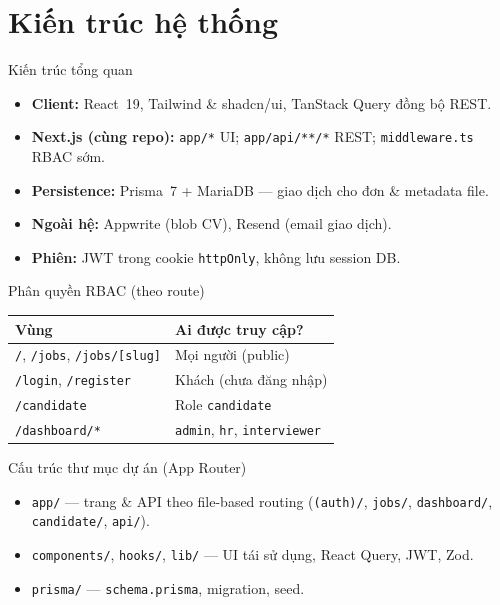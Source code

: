 \section{Kiến trúc hệ thống}
\begin{frame}{Kiến trúc tổng quan}
  \small
  \begin{itemize}
    \item \textbf{Client:} React~19, Tailwind \& shadcn/ui, TanStack Query đồng bộ REST.
    \item \textbf{Next.js (cùng repo):} \texttt{app/*} UI; \texttt{app/api/**/*} REST; \texttt{middleware.ts} RBAC sớm.
    \item \textbf{Persistence:} Prisma~7 + MariaDB --- giao dịch cho đơn \& metadata file.
    \item \textbf{Ngoài hệ:} Appwrite (blob CV), Resend (email giao dịch).
    \item \textbf{Phiên:} JWT trong cookie \texttt{httpOnly}, không lưu session DB.
  \end{itemize}
\end{frame}

\begin{frame}{Phân quyền RBAC (theo route)}
  \footnotesize
  \begin{tabular}{@{}p{}p{}@{}}
    \toprule
    \textbf{Vùng} & \textbf{Ai được truy cập?} \\
    \midrule
    \texttt{/}, \texttt{/jobs}, \texttt{/jobs/[slug]} & Mọi người (public) \\
    \texttt{/login}, \texttt{/register} & Khách (chưa đăng nhập) \\
    \texttt{/candidate} & Role \texttt{candidate} \\
    \texttt{/dashboard/*} & \texttt{admin}, \texttt{hr}, \texttt{interviewer} \\
    \bottomrule
  \end{tabular}
\end{frame}

\begin{frame}{Cấu trúc thư mục dự án (App Router)}
  \footnotesize
  \begin{itemize}
    \item \texttt{app/} --- trang \& API theo file-based routing (\texttt{(auth)/}, \texttt{jobs/}, \texttt{dashboard/}, \texttt{candidate/}, \texttt{api/}).
    \item \texttt{components/}, \texttt{hooks/}, \texttt{lib/} --- UI tái sử dụng, React Query, JWT, Zod.
    \item \texttt{prisma/} --- \texttt{schema.prisma}, migration, seed.
  \end{itemize}
\end{frame}
